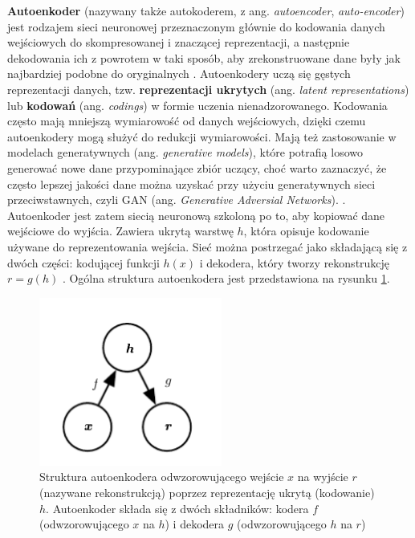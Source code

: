 \documentclass[12pt]{mwbk}
\theoremstyle{plain}
\theoremstyle{definition}
\theoremstyle{remark}
\newcommand\zrodlo[1]{\par\vspace{-3mm}{\small\textit{Źródło: }#1 }}
\begin{document}
	\textbf{Autoenkoder} (nazywany także autokoderem, z ang. \textit{autoencoder}, \textit{auto-encoder}) jest rodzajem sieci neuronowej przeznaczonym głównie do kodowania danych wejściowych do skompresowanej i znaczącej reprezentacji, a następnie dekodowania ich z powrotem w taki sposób, aby zrekonstruowane dane były jak najbardziej podobne do oryginalnych \cite{bank}. Autoenkodery uczą się gęstych reprezentacji danych, tzw. \textbf{reprezentacji ukrytych} (ang. \emph{latent representations}) lub \textbf{kodowań} (ang. \emph{codings}) w formie uczenia nienadzorowanego. Kodowania często mają mniejszą wymiarowość od danych wejściowych, dzięki czemu autoenkodery mogą  służyć do redukcji wymiarowości. Mają też zastosowanie w modelach generatywnych (ang. \emph{generative models}), które potrafią losowo generować nowe dane przypominające zbiór uczący, choć warto zaznaczyć, że często lepszej jakości dane można uzyskać przy użyciu generatywnych sieci przeciwstawnych, czyli GAN (ang. \textit{Generative Adversial Networks}).  \cite{geron}. Autoenkoder jest zatem siecią neuronową szkoloną po to, aby kopiować dane wejściowe do wyjścia. Zawiera ukrytą warstwę $h$, która opisuje kodowanie używane do reprezentowania wejścia. Sieć można postrzegać jako składającą się z dwóch części: kodującej funkcji $h(x)$ i dekodera, który tworzy rekonstrukcję $r=g(h)$  \cite{goodfellow}. Ogólna struktura autoenkodera jest przedstawiona na rysunku \ref{fig:autoencoder_structue}.

\begin{figure}[!h]
	\centering
	\includegraphics[width=6cm]{rys/autoencoder_structure.png}
	\caption{
		Struktura autoenkodera odwzorowującego wejście $x$ na wyjście $r$ (nazywane rekonstrukcją) poprzez reprezentację ukrytą (kodowanie) $h$. Autoenkoder składa się z dwóch składników: kodera $f$ (odwzorowującego $x$ na $h$) i dekodera $g$ (odwzorowującego $h$ na $r$)}
	\zrodlo{\cite{goodfellow}}
	\label{fig:autoencoder_structue}
\end{figure}
\end{document}

